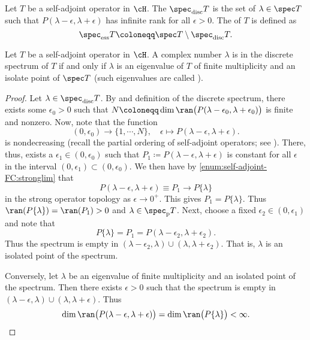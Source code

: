 \documentclass[oneside,reqno,letterpaper]{amsart}
\newcommand{\pspec}{\spec_{\mathrm{p}}}
\newcommand{\discspec}{\spec_{\text{disc}}}
\newcommand{\essspec}{\spec_{\text{ess}}}
\begin{document}
\begin{definition}
  Let \(T\) be a self-adjoint operator in \(\cH\). 
  The  \(\discspec T\) is the set of \(\lambda \in \spec T\) such that \(P(\lambda - \epsilon, \lambda + \epsilon)\) has infinite rank for all \(\epsilon > 0\). 
  The  of \(T\) is defined as
  \[
    \essspec T \coloneqq \spec T \setminus \discspec T.
  \]
\end{definition}

\begin{proposition}
  Let \(T\) be a self-adjoint operator in \(\cH\). 
  A complex number \(\lambda\) is in the discrete spectrum of \(T\) if and only if \(\lambda\) is an eigenvalue of \(T\) of finite multiplicity and an isolate point of \(\spec T\) (such eigenvalues are called ). 
\end{proposition}
\begin{proof}
  Let \(\lambda \in \discspec T\). 
  By  and definition of the discrete spectrum, there exists some \(\epsilon_0 > 0\) such that \(N \coloneqq \dim \ran\big(P(\lambda - \epsilon_0, \lambda + \epsilon_0)\big)\) is finite and nonzero. 
  Now, note that the function
  \[
  (0, \epsilon_0) \longrightarrow \{1, \cdots, N\}, 
  \quad \epsilon \longmapsto P(\lambda - \epsilon, \lambda + \epsilon). 
  \] 
  is nondecreasing (recall the partial ordering of self-adjoint operators; see ). 
  There, thus, exists a \(\epsilon_1 \in (0, \epsilon_0)\) such that \(P_1 \coloneqq P(\lambda - \epsilon, \lambda + \epsilon)\) is constant for all \(\epsilon\) in the interval \((0, \epsilon_1) \subset (0, \epsilon_0)\). 
  We then have by  \ref{enum:self-adjoint-FC:stronglim} that 
  \[
    P(\lambda - \epsilon, \lambda + \epsilon) \equiv P_1 \longrightarrow P \{\lambda\}
  \]
  in the strong operator topology as \(\epsilon \to 0^+\). 
  This gives \(P_1 = P \{\lambda\}\). 
  Thus \(\ran(P \{\lambda\}) = \ran(P_1) > 0\) and \(\lambda \in \pspec T\). 
  Next, choose a fixed \(\epsilon_2 \in (0, \epsilon_1)\) and note that 
  \[
    P \{\lambda\} = P_1 = P(\lambda - \epsilon_2, \lambda + \epsilon_2) . 
  \] 
  Thus the spectrum is empty in \((\lambda - \epsilon_2, \lambda) \cup (\lambda, \lambda + \epsilon_2)\). 
  That is, \(\lambda\) is an isolated point of the spectrum. 


  Conversely, let \(\lambda\) be an eigenvalue of finite multiplicity and an isolated point of the spectrum. 
  Then there exists \(\epsilon > 0\) such that the spectrum is empty in \((\lambda - \epsilon, \lambda) \cup (\lambda, \lambda + \epsilon)\). 
  Thus 
  \[
    \dim\ran\big(P(\lambda - \epsilon, \lambda + \epsilon)\big) = \dim\ran\big(P \{\lambda\} \big) < \infty . 
  \] 
\end{proof}
\end{document}
